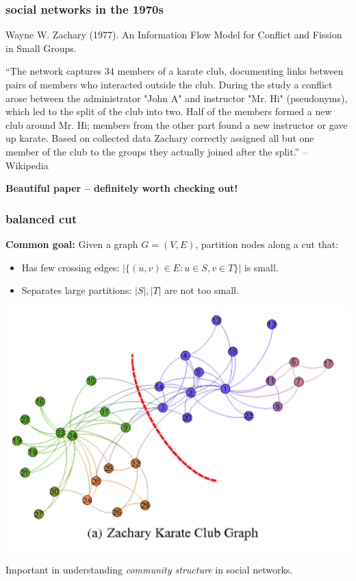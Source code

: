 \documentclass[compress]{beamer}
\begin{document}
\begin{frame}
	\frametitle{social networks in the 1970s}
	\begin{center}
	Wayne W. Zachary (1977). An Information Flow Model for Conflict and Fission in Small Groups.
	\end{center}
	
	\small{
	``The network captures 34 members of a karate club, documenting links between pairs of members who interacted outside the club. During the study a conflict arose between the administrator "John A" and instructor "Mr. Hi" (pseudonyms), which led to the split of the club into two. Half of the members formed a new club around Mr. Hi; members from the other part found a new instructor or gave up karate. Based on collected data Zachary correctly assigned all but one member of the club to the groups they actually joined after the split.'' -- Wikipedia
}
	
	\begin{center}
		\normalsize{\textbf{Beautiful paper -- definitely worth checking out!}}
	\end{center}
\end{frame}


\begin{frame}
	\frametitle{balanced cut}
	\textbf{Common goal:} Given a graph $G = (V,E)$, partition nodes along a cut that:
	\begin{itemize}
		\item Has few crossing edges: $|\{(u,v) \in E: u\in S,v\in T \}|$ is small.
		\item Separates large partitions: $|S|,|T|$ are not too small.
	\end{itemize}
	\vspace{-.5em}
	\begin{center}
		\includegraphics[width=.55\textwidth]{karate.png}
		\vspace{-1em}
	\end{center}
	Important in understanding \emph{community structure} in social networks. 
\end{frame}
\end{document}
